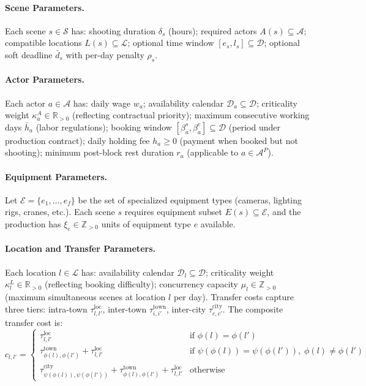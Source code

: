 \paragraph{Scene Parameters.}
Each scene $s \in \mathcal{S}$ has:
shooting duration $\delta_s$ (hours);
required actors $A(s) \subseteq \mathcal{A}$;
compatible locations $L(s) \subseteq \mathcal{L}$;
optional time window $[e_s, l_s] \subseteq \mathcal{D}$;
optional soft deadline $\bar{d}_s$ with per-day penalty $\rho_s$.

\paragraph{Actor Parameters.}
Each actor $a \in \mathcal{A}$ has:
daily wage $w_a$;
availability calendar $\mathcal{D}_a \subseteq \mathcal{D}$;
criticality weight $\kappa^A_a \in \mathbb{R}_{>0}$ (reflecting contractual priority);
maximum consecutive working days $\bar{h}_a$ (labor regulations);
booking window $[\beta^s_a, \beta^e_a] \subseteq \mathcal{D}$ (period under production contract);
daily holding fee $h_a \geq 0$ (payment when booked but not shooting);
minimum post-block rest duration $r_a$ (applicable to $a \in \mathcal{A}^P$).

\paragraph{Equipment Parameters.}
Let $\mathcal{E} = \{e_1, \ldots, e_f\}$ be the set of specialized equipment types (cameras, lighting rigs, cranes, etc.).
Each scene $s$ requires equipment subset $E(s) \subseteq \mathcal{E}$, and the production has $\xi_e \in \mathbb{Z}_{>0}$ units of equipment type $e$ available.

\paragraph{Location and Transfer Parameters.}
Each location $l \in \mathcal{L}$ has:
availability calendar $\mathcal{D}_l \subseteq \mathcal{D}$;
criticality weight $\kappa^L_l \in \mathbb{R}_{>0}$ (reflecting booking difficulty);
concurrency capacity $\mu_l \in \mathbb{Z}_{>0}$ (maximum simultaneous scenes at location $l$ per day).
Transfer costs capture three tiers:
intra-town $\tau^{\text{loc}}_{l,l'}$,
inter-town $\tau^{\text{town}}_{i,i'}$,
inter-city $\tau^{\text{city}}_{c,c'}$.
The composite transfer cost is:
\begin{equation}
c_{l,l'} = \begin{cases}
    \tau^{\text{loc}}_{l,l'} & \text{if } \phi(l) = \phi(l') \\[2pt]
    \tau^{\text{town}}_{\phi(l),\phi(l')} + \tau^{\text{loc}}_{l,l'} & \text{if } \psi(\phi(l)) = \psi(\phi(l')),\; \phi(l) \neq \phi(l') \\[2pt]
    \tau^{\text{city}}_{\psi(\phi(l)),\psi(\phi(l'))} + \tau^{\text{town}}_{\phi(l),\phi(l')} + \tau^{\text{loc}}_{l,l'} & \text{otherwise}
\end{cases}
\label{eq:transfer_cost}
\end{equation}


